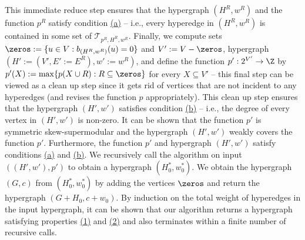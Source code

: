 This immediate reduce step ensures that the hypergraph $(H^R, w^R)$ and the function $p^R$ satisfy condition \hyperlink{WeakToStrong(a)}{(a)} -- i.e., every hyperedge in $(H^R, w^R)$ is contained in some set of $\mathcal{T}_{p^R, H^R, w^R}$. 
Finally, we compute sets $\zeros:=\{u\in V: b_{(H^R, w^R)}(u)=0\}$ and $V':=V-\zeros$, hypergraph $(H':=(V', E':=E^R), w':=w^R)$, and define the function $p':2^{V'}\rightarrow \Z$ by $p'(X):=\max\{p(X\cup R): R\subseteq \zeros\}$ for every $X\subseteq V'$ -- this final step can be viewed as a clean up step since it gets rid of vertices that are not incident to any hyperedges (and revises the function $p$ appropriately). 
This clean up step ensures that the hypergraph $(H', w')$ satisfies condition \hyperlink{WeakToStrong(b)}{(b)} -- i.e., the degree of every vertex in $(H', w')$ is non-zero. 
It can be shown that the function $p'$ is symmetric skew-supermodular and the hypergraph $(H', w')$ weakly covers the function $p'$. Furthermore, the function $p'$ and hypergraph $(H', w')$ satisfy conditions \hyperlink{WeakToStrong(a)}{(a)} and \hyperlink{WeakToStrong(b)}{(b)}. 
We recursively call the algorithm on input $((H', w'), p')$ to obtain a hypergraph $(H_0^*, w_0^*)$. We obtain the hypergraph $(G, c)$ from $(H_0^*, w_0^*)$ by adding the vertices $\zeros$ and return the hypergraph $(G+H_0, c+w_0)$.  
By induction on the total weight of hyperedges in the input hypergraph, it can be shown that our algorithm returns a hypergraph satisfying properties \hyperlink{WeakToStrong(1)}{(1)} and \hyperlink{WeakToStrong(2)}{(2)} and also terminates within a finite number of recursive calls. 

